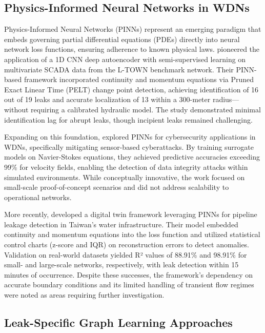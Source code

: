 \documentclass[final,5p,times,twocolumn,authoryear]{elsarticle}
\begin{document}
\subsection{Physics-Informed Neural Networks in WDNs}

Physics-Informed Neural Networks (PINNs) represent an emerging paradigm that embeds governing partial differential equations (PDEs) directly into neural network loss functions, ensuring adherence to known physical laws. \cite{TORNYEVIADZI2023106062} pioneered the application of a 1D CNN deep autoencoder with semi-supervised learning on multivariate SCADA data from the L-TOWN benchmark network. Their PINN-based framework incorporated continuity and momentum equations via Pruned Exact Linear Time (PELT) change point detection, achieving identification of 16 out of 19 leaks and accurate localization of 13 within a 300-meter radius—without requiring a calibrated hydraulic model. The study demonstrated minimal identification lag for abrupt leaks, though incipient leaks remained challenging.

Expanding on this foundation, \cite{falas2020pinnwatersecurity} explored PINNs for cybersecurity applications in WDNs, specifically mitigating sensor-based cyberattacks. By training surrogate models on Navier-Stokes equations, they achieved predictive accuracies exceeding 99\% for velocity fields, enabling the detection of data integrity attacks within simulated environments. While conceptually innovative, the work focused on small-scale proof-of-concept scenarios and did not address scalability to operational networks.

More recently, \cite{lin2025digitaltwin} developed a digital twin framework leveraging PINNs for pipeline leakage detection in Taiwan's water infrastructure. Their model embedded continuity and momentum equations into the loss function and utilized statistical control charts (z-score and IQR) on reconstruction errors to detect anomalies. Validation on real-world datasets yielded R² values of 88.91\% and 98.91\% for small- and large-scale networks, respectively, with leak detection within 15 minutes of occurrence. Despite these successes, the framework's dependency on accurate boundary conditions and its limited handling of transient flow regimes were noted as areas requiring further investigation.



\subsection{Leak-Specific Graph Learning Approaches}
\end{document}
